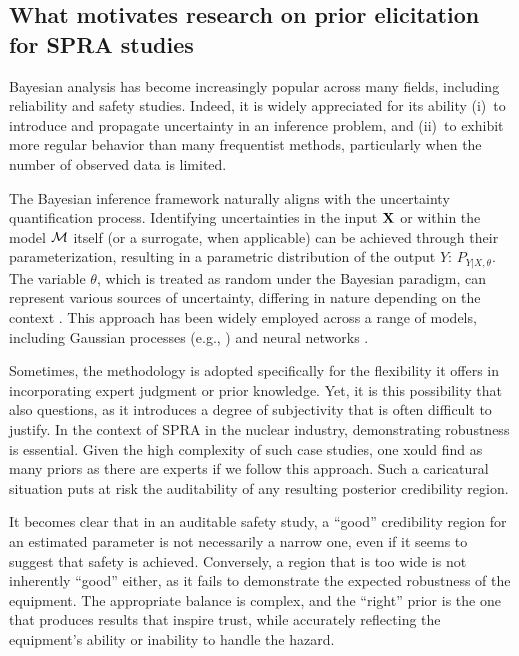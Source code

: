 \subsection{What motivates research on prior elicitation for SPRA studies}

Bayesian analysis has become increasingly popular across many fields, including reliability and safety studies. Indeed, it is widely appreciated for its ability (i)~to introduce and propagate uncertainty in an inference problem, and (ii)~to exhibit more regular behavior than many frequentist methods, particularly when the number of observed data is limited.

The Bayesian inference framework naturally aligns with the  uncertainty quantification process. Identifying uncertainties in the input $\mathbf{X}$ or within the model $\mathcal{M}$ itself (or a surrogate, when applicable) can be achieved through their parameterization, resulting in a parametric distribution of the output $Y$: $P_{Y|X,\theta}$. The variable $\theta$, which is treated as random under the Bayesian paradigm, can represent various sources of uncertainty, differing in nature depending on the context \citep{bousquet_contributions_2024}. This approach has been widely employed across a range of models, including Gaussian processes (e.g., \cite{gu_parallel_2016}) and neural networks \citep{arbel_bayes_2023}.

Sometimes, the methodology is adopted specifically for the flexibility it offers in incorporating expert judgment or prior knowledge. Yet, it is this possibility that also questions, as it introduces a degree of subjectivity that is often difficult to justify. In the context of SPRA in the nuclear industry, demonstrating robustness is essential. Given the high complexity of such case studies, 
one xould find as many priors as there are experts if we follow this approach.
Such a caricatural situation puts at risk the auditability of any resulting posterior credibility region.

It becomes clear that in an auditable safety study, a ``good'' credibility region for an estimated parameter is not necessarily a narrow one, even if it seems to suggest that safety is achieved. Conversely, a region that is too wide is not inherently ``good'' either, as it fails to demonstrate the expected robustness of the equipment. The appropriate balance is complex, and the ``right'' prior is the one that produces results that inspire trust, while accurately reflecting the equipment’s ability or inability to handle the hazard.

